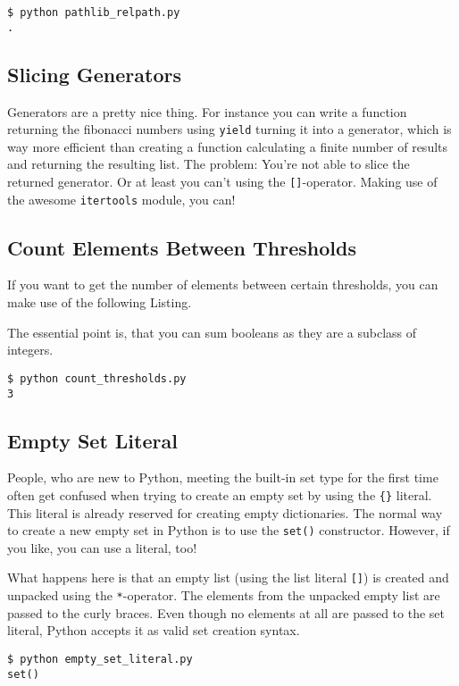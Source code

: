 \begin{lstlisting}[caption=Output of pathlib\_relpath.py]
$ python pathlib_relpath.py
.
\end{lstlisting}


\subsection{Slicing Generators}

Generators are a pretty nice thing.
For instance you can write a function returning the fibonacci numbers using \lstinline{yield} turning it into a generator, which is way more efficient than creating a function calculating a finite number of results and returning the resulting list.
The problem: You're not able to slice the returned generator.
Or at least you can't using the \lstinline{[]}-operator.
Making use of the awesome \lstinline{itertools} module, you can!




\subsection{Count Elements Between Thresholds}

If you want to get the number of elements between certain thresholds, you can make use of the following Listing.



The essential point is, that you can sum booleans as they are a subclass of integers.

\begin{lstlisting}[caption=Output of count\_thresholds.py]
$ python count_thresholds.py
3
\end{lstlisting}


\subsection{Empty Set Literal}

People, who are new to Python, meeting the built-in set type for the first time often get confused when trying to create an empty set by using the \lstinline|{}| literal.
This literal is already reserved for creating empty dictionaries.
The normal way to create a new empty set in Python is to use the \lstinline{set()} constructor.
However, if you like, you can use a literal, too!



What happens here is that an empty list (using the list literal \lstinline{[]}) is created and unpacked using the \lstinline{*}-operator.
The elements from the unpacked empty list are passed to the curly braces.
Even though no elements at all are passed to the set literal, Python accepts it as valid set creation syntax.

\begin{lstlisting}[caption=Output of empty\_set\_literal.py]
$ python empty_set_literal.py
set()
\end{lstlisting}
